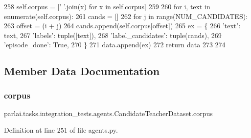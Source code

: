 \begin{DoxyCode}
258         self.corpus = [\textcolor{stringliteral}{' '}.join(x) \textcolor{keywordflow}{for} x \textcolor{keywordflow}{in} self.corpus]
259 
260         \textcolor{keywordflow}{for} i, text \textcolor{keywordflow}{in} enumerate(self.corpus):
261             cands = []
262             \textcolor{keywordflow}{for} j \textcolor{keywordflow}{in} range(NUM\_CANDIDATES):
263                 offset = (i + j) %
264                 cands.append(self.corpus[offset])
265             ex = \{
266                 \textcolor{stringliteral}{'text'}: text,
267                 \textcolor{stringliteral}{'labels'}: tuple([text]),
268                 \textcolor{stringliteral}{'label\_candidates'}: tuple(cands),
269                 \textcolor{stringliteral}{'episode\_done'}: \textcolor{keyword}{True},
270             \}
271             data.append(ex)
272         \textcolor{keywordflow}{return} data
273 
274 
\end{DoxyCode}


\subsection{Member Data Documentation}
\mbox{\label{classparlai_1_1tasks_1_1integration__tests_1_1agents_1_1CandidateTeacherDataset_a50724de577ec145045c072a46ad050f7}} 
\subsubsection{\texorpdfstring{corpus}{corpus}}
{\footnotesize\ttfamily parlai.\+tasks.\+integration\+\_\+tests.\+agents.\+Candidate\+Teacher\+Dataset.\+corpus}



Definition at line 251 of file agents.\+py.

\mbox{\label{classparlai_1_1tasks_1_1integration__tests_1_1agents_1_1CandidateTeacherDataset_acfb21ed18e9b2e93f578a18f03d694fd}} 
